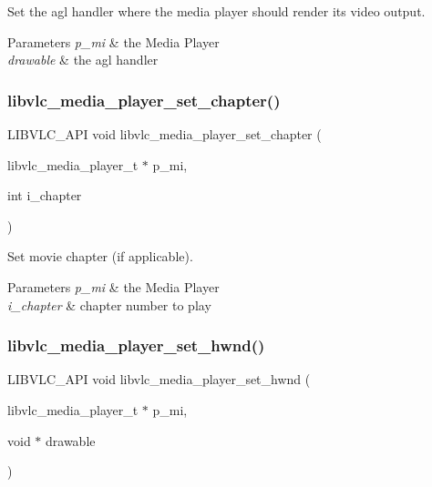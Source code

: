 Set the agl handler where the media player should render its video output.


\begin{DoxyParams}{Parameters}
{\em p\+\_\+mi} & the Media Player \\
\hline
{\em drawable} & the agl handler \\
\hline
\end{DoxyParams}
\mbox{\label{group__libvlc__media__player_gae8f1cbc7f17ab01c99511adf1b457860}} 
\subsubsection{\texorpdfstring{libvlc\+\_\+media\+\_\+player\+\_\+set\+\_\+chapter()}{libvlc\_media\_player\_set\_chapter()}}
{\footnotesize\ttfamily L\+I\+B\+V\+L\+C\+\_\+\+A\+PI void libvlc\+\_\+media\+\_\+player\+\_\+set\+\_\+chapter (\begin{DoxyParamCaption}\item[{libvlc\+\_\+media\+\_\+player\+\_\+t $\ast$}]{p\+\_\+mi,  }\item[{int}]{i\+\_\+chapter }\end{DoxyParamCaption})}

Set movie chapter (if applicable).


\begin{DoxyParams}{Parameters}
{\em p\+\_\+mi} & the Media Player \\
\hline
{\em i\+\_\+chapter} & chapter number to play \\
\hline
\end{DoxyParams}
\mbox{\label{group__libvlc__media__player_ga0ee3abb85cd9735fdeace4882eb711f3}} 
\subsubsection{\texorpdfstring{libvlc\+\_\+media\+\_\+player\+\_\+set\+\_\+hwnd()}{libvlc\_media\_player\_set\_hwnd()}}
{\footnotesize\ttfamily L\+I\+B\+V\+L\+C\+\_\+\+A\+PI void libvlc\+\_\+media\+\_\+player\+\_\+set\+\_\+hwnd (\begin{DoxyParamCaption}\item[{libvlc\+\_\+media\+\_\+player\+\_\+t $\ast$}]{p\+\_\+mi,  }\item[{void $\ast$}]{drawable }\end{DoxyParamCaption})}

